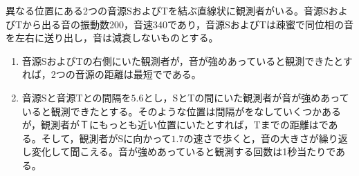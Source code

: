 \hakosyokika
\item 異なる位置にある2つの音源SおよびTを結ぶ直線状に観測者がいる。音源SおよびTから出る音の振動数200，音速340であり，音源SおよびTは疎蜜で同位相の音を左右に送り出し，音は減衰しないものとする。
    \begin{enumerate}
        \item 音源SおよびTの右側にいた観測者が，音が強めあっていると観測できたとすれば，2つの音源の距離は最短で\Hako {}である。
        \item 音源Sと音源Tとの間隔を$5.6$とし，SとTの間にいた観測者が音が強めあっていると観測できたとする。そのような位置は間隔が\Hako {}をなしていくつかあるが，観測者がＴにもっとも近い位置にいたとすれば，Tまでの距離は\Hako {}である。そして，観測者がSに向かって$1.7$の速さで歩くと，音の大きさが繰り返し変化して聞こえる。音が強めあっていると観測する回数は1秒当たり\Hako {}である。
    \end{enumerate}